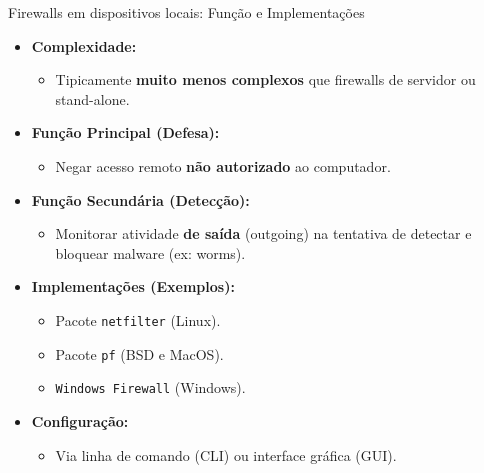 \begin{frame}{Firewalls em dispositivos locais: Função e Implementações}
    \begin{itemize}
        \item \textbf{Complexidade:}
              \begin{itemize}
                  \item Tipicamente \textbf{muito menos complexos} que firewalls de servidor ou stand-alone.
              \end{itemize}

        \item \textbf{Função Principal (Defesa):}
              \begin{itemize}
                  \item Negar acesso remoto \textbf{não autorizado} ao computador.
              \end{itemize}

        \item \textbf{Função Secundária (Detecção):}
              \begin{itemize}
                  \item Monitorar atividade \textbf{de saída} (outgoing) na tentativa de detectar e bloquear malware (ex: worms).
              \end{itemize}

        \item \textbf{Implementações (Exemplos):}
              \begin{itemize}
                  \item Pacote \texttt{netfilter} (Linux).
                  \item Pacote \texttt{pf} (BSD e MacOS).
                  \item \texttt{Windows Firewall} (Windows).
              \end{itemize}

        \item \textbf{Configuração:}
              \begin{itemize}
                  \item Via linha de comando (CLI) ou interface gráfica (GUI).
              \end{itemize}
    \end{itemize}
\end{frame}

